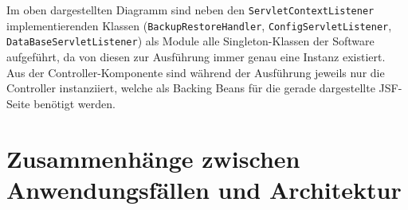 \documentclass[fontsize=12pt,paper=a4,twoside]{scrartcl}
\begin{document}
Im oben dargestellten Diagramm sind neben den \texttt{ServletContextListener} implementierenden Klassen (\texttt{BackupRestoreHandler}, \texttt{ConfigServletListener}, \texttt{DataBaseServletListener}) als Module alle Singleton-Klassen der Software aufgeführt, da von diesen zur Ausführung immer genau eine Instanz existiert. \\
Aus der Controller-Komponente sind während der Ausführung jeweils nur die Controller instanziiert, welche als Backing Beans für die gerade dargestellte JSF-Seite benötigt werden.

\section[Zusammenhänge zwischen Anwendungsfällen und Architektur]{Zusammenhänge zwischen Anwendungsfällen und Architektur}
\label{sec:anwendungsfaelle}
\end{document}
